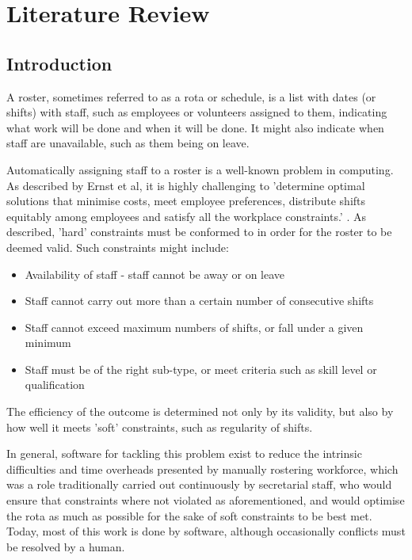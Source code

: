 \chapter{Literature Review}

\section{Introduction}

A roster, sometimes referred to as a rota or schedule, is a list with dates (or shifts) with staff, such as employees or volunteers assigned to them, indicating what work will be done and when it will be done. It might also indicate when staff are unavailable, such as them being on leave. \cite{CollinsRoster}

Automatically assigning staff to a roster is a well-known problem in computing. As described by Ernst et al, it is highly challenging to 'determine optimal solutions that minimise costs, meet employee preferences, distribute shifts equitably among employees and satisfy all the workplace constraints.' \cite{ERNST20043}. As described, 'hard' constraints must be conformed to in order for the roster to be deemed valid. Such constraints might include: \cite{Chen2016}

\begin{itemize}
    \item Availability of staff - staff cannot be away or on leave
    \item Staff cannot carry out more than a certain number of consecutive shifts
    \item Staff cannot exceed maximum numbers of shifts, or fall under a given minimum
    \item Staff must be of the right sub-type, or meet criteria such as skill level or qualification
\end{itemize}

The efficiency of the outcome is determined not only by its validity, but also by how well it meets 'soft' constraints, such as regularity of shifts.

In general, software for tackling this problem exist to reduce the intrinsic difficulties and time overheads presented by manually rostering workforce, which was a role traditionally carried out continuously by secretarial staff, who would ensure that constraints where not violated as aforementioned, and would optimise the rota as much as possible for the sake of soft constraints to be best met. Today, most of this work is done by software, although occasionally conflicts must be resolved by a human. \cite{Maes1994AgentsTR}

